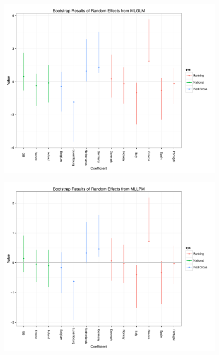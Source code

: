 \documentclass[11pt,article,oneside]{memoir}
\begin{document}
\begin{landscape}
\begin{figure}[h]
\includegraphics[width=8in]{figures/mlglmrebootplot.pdf}
\end{figure}
\end{landscape}
\restoregeometry

\begin{landscape}
\begin{figure}[h]
\includegraphics[width=8in]{figures/mllpmrebootplot.pdf}
\end{figure}
\end{landscape}
\restoregeometry
\end{document}

